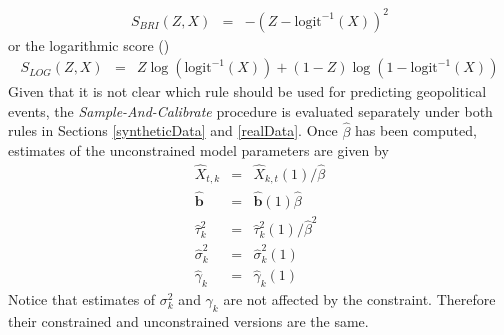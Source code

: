 \documentclass[aoas, preprint]{imsart}
\numberwithin{equation}{section}
\theoremstyle{plain}
\newcommand{\logit}{\text{logit}}
\begin{document}
\begin{eqnarray*}
S_{BRI}(Z, X) &=& -(Z - \logit^{-1}(X))^2
\end{eqnarray*}
or the logarithmic score (\citet{good1952rational})
\begin{eqnarray*}
S_{LOG}(Z, X) &=& Z \log\left(\logit^{-1}(X)\right) + (1-Z) \log\left(1-\logit^{-1}(X)\right)
\end{eqnarray*}
Given that it is not clear which rule should be used for predicting geopolitical events, the \textit{Sample-And-Calibrate} procedure is evaluated  separately under both rules in Sections \ref{syntheticData} and \ref{realData}. Once $\hat{\beta}$ has been computed, estimates of the unconstrained model parameters are given by
\begin{eqnarray}
 \hat{X}_{t,k}&=& \hat{X}_{k,t}(1) / \hat{\beta} \nonumber\\
 \hat{\boldsymbol{b}}&=& \hat{\boldsymbol{b}}(1) \hat{\beta} \nonumber\\
   \hat{\tau}_{k}^2&=& \hat{\tau}_{k}^2(1)/ \hat{\beta}^2\nonumber\\
  \hat{\sigma}_{k}^2&=& \hat{\sigma}_{k}^2(1)\nonumber\\
  \hat{\gamma}_{k}&=& \hat{\gamma}_{k}(1)\nonumber
\end{eqnarray}
Notice that estimates of $\sigma^2_k$ and $\gamma_k$ are not affected by the constraint. Therefore their constrained and unconstrained versions are the same.
\end{document}
